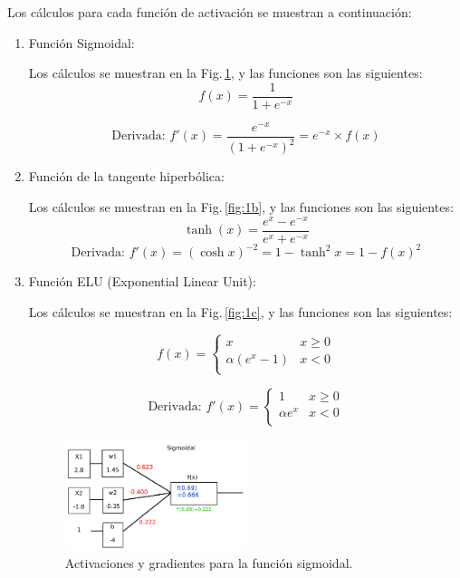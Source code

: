 Los cálculos para cada función de activación se muestran a continuación:

\begin{enumerate}[label=(\alph*)]
    \item Función Sigmoidal:
    
    Los cálculos se muestran en la Fig.\,\ref{fig:1a}, y las funciones son las siguientes:
    \[
        f(x) = \frac{1}{1 + e^{-x}}
    \]
    
    \[
       \text{Derivada: } f'(x) = \frac{e^{-x}}{(1 + e^{-x})^2} =  e^{-x}\times f(x)
    \]

    \item Función de la tangente hiperbólica:
    
    Los cálculos se muestran en la Fig.\,\ref{fig:1b}, y las funciones son las siguientes:
    \[  
        \tanh(x) = \frac{e^{x} - e^{-x} }{e^{x} + e^{-x}}
    \]
    \[
        \text{Derivada: }  f'(x) =  (\cosh{x})^{-2} = 1 - \tanh^2x = 1 - f(x)^2
    \]



    \item Función ELU (Exponential Linear Unit):
    
    Los cálculos se muestran en la Fig.\,\ref{fig:1c}, y las funciones son las siguientes:

    \[  f(x)=
        \begin{cases}
            x  & x \geq 0 \\
            \alpha(e^x - 1) & x < 0\\
        \end{cases}
        \]

    \[  \text{Derivada: } f'(x)=
        \begin{cases}
            1  & x \geq 0 \\
            \alpha e^x & x < 0\\
        \end{cases}
        \]


        \begin{figure}[H]
            \begin{small}
                \begin{center}
                    \includegraphics[width=0.5\textwidth]{Graphs/ejer1a.pdf}
                \end{center}
                \caption{Activaciones y gradientes para la función sigmoidal.}
                \label{fig:1a}
            \end{small}
        \end{figure}


\end{enumerate}
